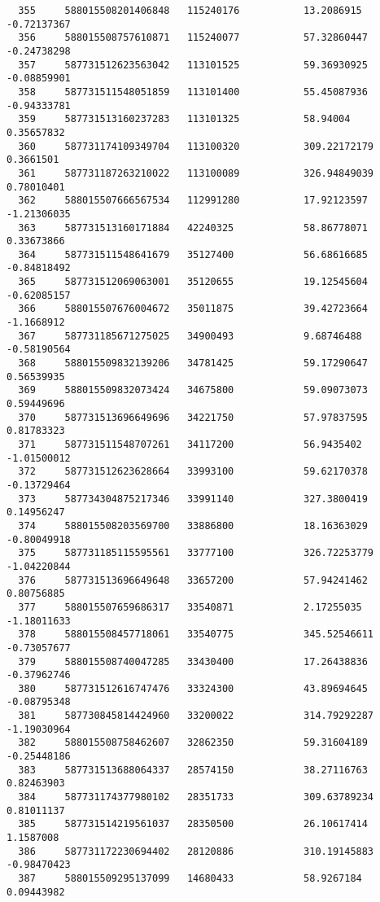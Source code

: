 \documentclass[a4paper,11pt]{article}
\begin{document}
\begin{verbatim}
  355     588015508201406848   115240176           13.2086915     -0.72137367  
  356     588015508757610871   115240077           57.32860447    -0.24738298  
  357     587731512623563042   113101525           59.36930925    -0.08859901  
  358     587731511548051859   113101400           55.45087936    -0.94333781  
  359     587731513160237283   113101325           58.94004       0.35657832   
  360     587731174109349704   113100320           309.22172179   0.3661501    
  361     587731187263210022   113100089           326.94849039   0.78010401   
  362     588015507666567534   112991280           17.92123597    -1.21306035  
  363     587731513160171884   42240325            58.86778071    0.33673866   
  364     587731511548641679   35127400            56.68616685    -0.84818492  
  365     587731512069063001   35120655            19.12545604    -0.62085157  
  366     588015507676004672   35011875            39.42723664    -1.1668912   
  367     587731185671275025   34900493            9.68746488     -0.58190564  
  368     588015509832139206   34781425            59.17290647    0.56539935   
  369     588015509832073424   34675800            59.09073073    0.59449696   
  370     587731513696649696   34221750            57.97837595    0.81783323   
  371     587731511548707261   34117200            56.9435402     -1.01500012  
  372     587731512623628664   33993100            59.62170378    -0.13729464  
  373     587734304875217346   33991140            327.3800419    0.14956247   
  374     588015508203569700   33886800            18.16363029    -0.80049918  
  375     587731185115595561   33777100            326.72253779   -1.04220844  
  376     587731513696649648   33657200            57.94241462    0.80756885   
  377     588015507659686317   33540871            2.17255035     -1.18011633  
  378     588015508457718061   33540775            345.52546611   -0.73057677  
  379     588015508740047285   33430400            17.26438836    -0.37962746  
  380     587731512616747476   33324300            43.89694645    -0.08795348  
  381     587730845814424960   33200022            314.79292287   -1.19030964  
  382     588015508758462607   32862350            59.31604189    -0.25448186  
  383     587731513688064337   28574150            38.27116763    0.82463903   
  384     587731174377980102   28351733            309.63789234   0.81011137   
  385     587731514219561037   28350500            26.10617414    1.1587008    
  386     587731172230694402   28120886            310.19145883   -0.98470423  
  387     588015509295137099   14680433            58.9267184     0.09443982   
\end{verbatim}
\end{document}
